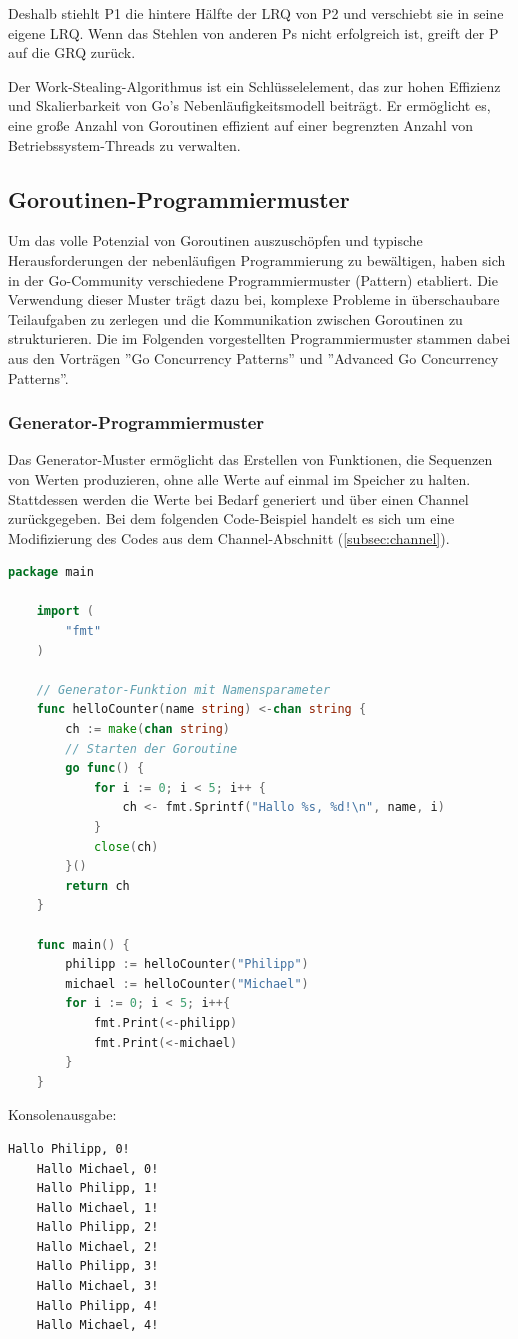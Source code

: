 \documentclass[fontsize=12pt,paper=a4,twoside=semi,parskip=half-,headsepline,headinclude]{scrreprt}
\begin{document}
Deshalb stiehlt P1 die hintere Hälfte der LRQ von P2 und verschiebt sie in seine eigene LRQ. Wenn das Stehlen von anderen Ps nicht erfolgreich ist, greift der P auf die GRQ zurück.

Der Work-Stealing-Algorithmus ist ein Schlüsselelement, das zur hohen Effizienz und Skalierbarkeit von Go's Nebenläufigkeitsmodell beiträgt. Er ermöglicht es, eine große Anzahl von Goroutinen effizient auf einer begrenzten Anzahl von Betriebssystem-Threads zu verwalten.

\subsection{Goroutinen-Programmiermuster}

Um das volle Potenzial von Goroutinen auszuschöpfen und typische Herausforderungen der nebenläufigen Programmierung zu bewältigen, haben sich in der Go-Community verschiedene Programmiermuster (Pattern) etabliert. Die Verwendung dieser Muster trägt dazu bei, komplexe Probleme in überschaubare Teilaufgaben zu zerlegen und die Kommunikation zwischen Goroutinen zu strukturieren. Die im Folgenden vorgestellten Programmiermuster stammen dabei aus den Vorträgen ''Go Concurrency Patterns''\cite{Pike2012} und ''Advanced Go Concurrency Patterns''\cite{Ajmani2013}.

\subsubsection{Generator-Programmiermuster}
\label{subsubsec:generator}

Das Generator-Muster ermöglicht das Erstellen von Funktionen, die Sequenzen von Werten produzieren, ohne alle Werte auf einmal im Speicher zu halten. Stattdessen werden die Werte bei Bedarf generiert und über einen Channel zurückgegeben. Bei dem folgenden Code-Beispiel handelt es sich um eine Modifizierung des Codes aus dem Channel-Abschnitt (\ref{subsec:channel}).

\begin{lstlisting}[language=Go,extendedchars=true]
	package main
	
	import (
		"fmt"
	)

	// Generator-Funktion mit Namensparameter
	func helloCounter(name string) <-chan string {
		ch := make(chan string)
		// Starten der Goroutine
		go func() {
			for i := 0; i < 5; i++ {
				ch <- fmt.Sprintf("Hallo %s, %d!\n", name, i)
			}
			close(ch)
		}()
		return ch
	}

	func main() {
		philipp := helloCounter("Philipp")
		michael := helloCounter("Michael")
		for i := 0; i < 5; i++{
			fmt.Print(<-philipp)
			fmt.Print(<-michael)
		}
	}
\end{lstlisting}
Konsolenausgabe:
\begin{lstlisting}[frame=shadowbox, rulecolor=\color{black}, backgroundcolor=\color{gray!10}]
	Hallo Philipp, 0!
	Hallo Michael, 0!
	Hallo Philipp, 1!
	Hallo Michael, 1!
	Hallo Philipp, 2!
	Hallo Michael, 2!
	Hallo Philipp, 3!
	Hallo Michael, 3!
	Hallo Philipp, 4!
	Hallo Michael, 4!
\end{lstlisting}
\end{document}
